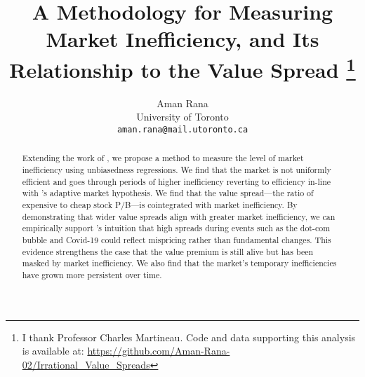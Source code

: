 \documentclass[11pt,a4paper,english]{article}
\date{\displaydate{date}}
\title{A Methodology for Measuring Market Inefficiency, and Its Relationship to the Value Spread 
\thanks{I thank Professor Charles Martineau. Code and data supporting this analysis is available at: \url{https://github.com/Aman-Rana-02/Irrational_Value_Spreads}}}
\author{%
  Aman Rana\\
  \small University of Toronto\\
  \small\texttt{aman.rana@mail.utoronto.ca}
}
\begin{document}
  \maketitle

  \begin{abstract}
    \noindent Extending the work of \citep{boguth_2023}, we propose a method to measure the level of market inefficiency using unbiasedness regressions.
    We find that the market is not uniformly efficient and goes through periods of higher inefficiency reverting to efficiency in-line with \cite{lo_amh}'s adaptive 
    market hypothesis. We find that the value spread—the ratio of expensive to cheap stock P/B—is cointegrated with market inefficiency. 
    By demonstrating that wider value spreads align with greater market inefficiency, we can empirically support \citet{asness_2024}'s intuition 
    that high spreads during events such as the dot-com bubble and Covid-19 could reflect mispricing rather than fundamental changes. 
    This evidence strengthens the case that the value premium is still alive but has been masked by market inefficiency. 
    We also find that the market's temporary inefficiencies have grown more persistent over time.
  \end{abstract}

  \newpage
  \tableofcontents

  \newpage
  

  \newpage
  

  
  
  \newpage
  

  \newpage
  

  \newpage
  

  \newpage
  
  
\end{document}
